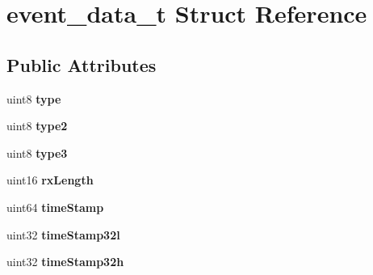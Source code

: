 \hypertarget{structevent__data__t}{\section{event\-\_\-data\-\_\-t Struct Reference}
\label{structevent__data__t}
}
\subsection*{Public Attributes}
\begin{DoxyCompactItemize}
\item 
\hypertarget{structevent__data__t_ad27ad39a57e07b9f327bb60867a33037}{uint8 {\bfseries type}}\label{structevent__data__t_ad27ad39a57e07b9f327bb60867a33037}

\item 
\hypertarget{structevent__data__t_a2989c9e9712023a801153a60db2aeb83}{uint8 {\bfseries type2}}\label{structevent__data__t_a2989c9e9712023a801153a60db2aeb83}

\item 
\hypertarget{structevent__data__t_ad5a0dda59be22c0231dc95bd0697ac64}{uint8 {\bfseries type3}}\label{structevent__data__t_ad5a0dda59be22c0231dc95bd0697ac64}

\item 
\hypertarget{structevent__data__t_a5699cea64aa6a2d764bf55e0e39ad4e2}{uint16 {\bfseries rx\-Length}}\label{structevent__data__t_a5699cea64aa6a2d764bf55e0e39ad4e2}

\item 
\hypertarget{structevent__data__t_a1452c936afb030abb3fe9df0af5ea045}{uint64 {\bfseries time\-Stamp}}\label{structevent__data__t_a1452c936afb030abb3fe9df0af5ea045}

\item 
\hypertarget{structevent__data__t_a3c25626381670a6b48d7da7c8705cfb6}{uint32 {\bfseries time\-Stamp32l}}\label{structevent__data__t_a3c25626381670a6b48d7da7c8705cfb6}

\item 
\hypertarget{structevent__data__t_a776641ab6397a24d75922be171ad66e8}{uint32 {\bfseries time\-Stamp32h}}\label{structevent__data__t_a776641ab6397a24d75922be171ad66e8}


\end{DoxyCompactItemize}
